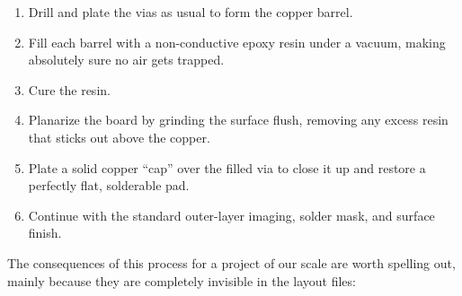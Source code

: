 \documentclass[12pt, a4paper]{article}
\begin{document}
\begin{enumerate}
  \item Drill and plate the vias as usual to form the copper barrel.
  \item Fill each barrel with a non-conductive epoxy resin under a vacuum, making absolutely sure no air gets trapped.
  \item Cure the resin.
  \item Planarize the board by grinding the surface flush, removing any excess resin that sticks out above the copper.
  \item Plate a solid copper ``cap'' over the filled via to close it up and restore a perfectly flat, solderable pad.
  \item Continue with the standard outer-layer imaging, solder mask, and surface finish.
\end{enumerate}
The consequences of this process for a project of our scale are worth spelling out, mainly because they are completely invisible in the layout files:
\end{document}
